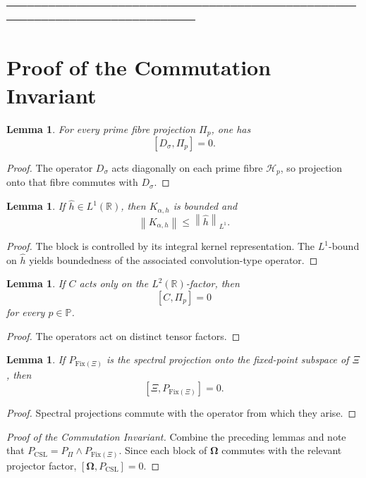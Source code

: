 \documentclass[11pt]{article}
\theoremstyle{plain}
\newtheorem{lemma}[theorem]{Lemma}
\theoremstyle{definition}
\theoremstyle{remark}
\newcommand{\Pset}{\mathbb{P}}
\newcommand{\R}{\mathbb{R}}
\newcommand{\Om}{\boldsymbol{\Omega}}
\newcommand{\PCSL}{P_{\mathrm{CSL}}}
\newcommand{\norm}[1]{\left\lVert #1 \right\rVert}
\begin{document}
% 
─────────────────────────────────────────────────────────────────────────────
\section{Proof of the Commutation Invariant}

\begin{lemma}
For every prime fibre projection \(\Pi_p\), one has
\[
[D_\sigma,\Pi_p]=0.
\]
\end{lemma}

\begin{proof}
The operator \(D_\sigma\) acts diagonally on each prime fibre \(\mathcal{H}_p\), so projection onto that fibre commutes with \(D_\sigma\).
\end{proof}

\begin{lemma}
If \(\widehat{h}\in L^1(\R)\), then \(K_{\alpha,h}\) is bounded and
\[
\norm{K_{\alpha,h}} \le \norm{\widehat{h}}_{L^1}.
\]
\end{lemma}

\begin{proof}
The block is controlled by its integral kernel representation. The \(L^1\)-bound on \(\widehat{h}\) yields boundedness of the associated convolution-type operator.
\end{proof}

\begin{lemma}
If \(C\) acts only on the \(L^2(\R)\)-factor, then
\[
[C,\Pi_p]=0
\]
for every \(p\in\Pset\).
\end{lemma}

\begin{proof}
The operators act on distinct tensor factors.
\end{proof}

\begin{lemma}
If \(P_{\mathrm{Fix}(\Xi)}\) is the spectral projection onto the fixed-point subspace of \(\Xi\), then
\[
[\Xi, P_{\mathrm{Fix}(\Xi)}]=0.
\]
\end{lemma}

\begin{proof}
Spectral projections commute with the operator from which they arise.
\end{proof}

\begin{proof}[Proof of the Commutation Invariant]
Combine the preceding lemmas and note that \(\PCSL = P_\Pi \wedge P_{\mathrm{Fix}(\Xi)}\). Since each block of \(\Om\) commutes with the relevant projector factor, \([\Om,\PCSL]=0\).
\end{proof}
\end{document}

